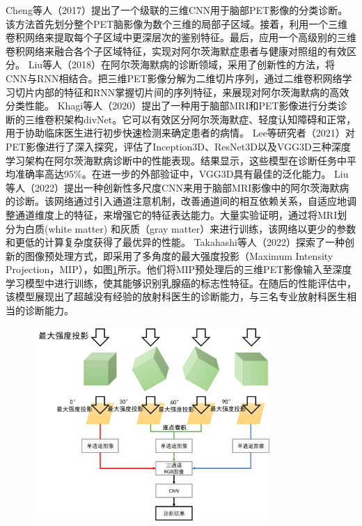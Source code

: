 Cheng等人\cite{cheng2017classification}（2017）提出了一个级联的三维CNN用于脑部PET影像的分类诊断。该方法首先划分整个PET脑影像为数个三维的局部子区域。接着，利用一个三维卷积网络来提取每个子区域中更深层次的鉴别特征。最后，应用一个高级别的三维卷积网络来融合各个子区域特征，实现对阿尔茨海默症患者与健康对照组的有效区分。
Liu等人\cite{liu2018classification}（2018）在阿尔茨海默病的诊断领域，采用了创新性的方法，将CNN与RNN相结合。把三维PET影像分解为二维切片序列，通过二维卷积网络学习切片内部的特征和RNN掌握切片间的序列特征，来展现对阿尔茨海默病的高效分类性能。
Khagi等人\cite{khagi2020cnn}（2020）提出了一种用于脑部MRI和PET影像进行分类诊断的三维卷积架构divNet。它可以有效区分阿尔茨海默症、轻度认知障碍和正常，用于协助临床医生进行初步快速检测来确定患者的病情。
Lee等研究者\cite{lee2021performance}（2021）对PET影像进行了深入探究，评估了Inception3D、ResNet3D以及VGG3D三种深度学习架构在阿尔茨海默病诊断中的性能表现。结果显示，这些模型在诊断任务中平均准确率高达95\%。在进一步的外部验证中，VGG3D具有最佳的泛化能力。
Liu等人\cite{liu2022diagnosis}（2022）提出一种创新性多尺度CNN来用于脑部MRI影像中的阿尔茨海默病的诊断。该网络通过引入通道注意机制，改善通道间的相互依赖关系，自适应地调整通道维度上的特征，来增强它的特征表达能力。大量实验证明，通过将MRI划分为白质(white matter) 和灰质（gray matter）来进行训练，该网络以更少的参数和更低的计算复杂度获得了最优异的性能。
Takahashi等人\cite{takahashi2022deep}（2022）探索了一种创新的图像预处理方式，即采用了多角度的最大强度投影（Maximum Intensity Projection，MIP），如图\ref{fig:chap02_mip}所示。他们将MIP预处理后的三维PET影像输入至深度学习模型中进行训练，使其能够识别乳腺癌的标志性特征。在随后的性能评估中，该模型展现出了超越没有经验的放射科医生的诊断能力，与三名专业放射科医生相当的诊断能力。

\begin{figure}[htbp]
  \centering
  \includegraphics[width=0.8\textwidth]{figures/chap02_mip.jpg}
  \label{fig:chap02_mip}
\end{figure}

